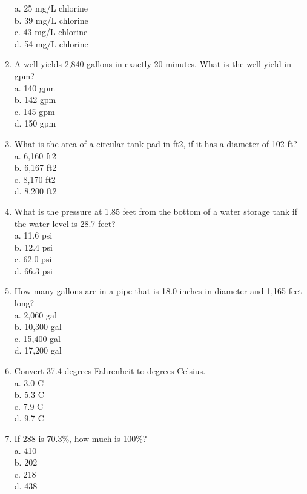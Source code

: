 \documentclass{article}
\begin{document}
\begin{enumerate}
a.	25 mg/L chlorine\\
b.	39 mg/L chlorine\\
c.	43 mg/L chlorine\\
d.	54 mg/L chlorine\\
\item A well yields 2,840 gallons in exactly 20 minutes. What is the well yield in gpm?\\
a.	140 gpm\\
b.	142 gpm\\
c.	145 gpm\\
d.	150 gpm\\
\item What is the area of a circular tank pad in ft2, if it has a diameter of 102 ft?\\
a.	6,160 ft2\\
b.	6,167 ft2\\
c.	8,170 ft2\\
d.	8,200 ft2\\
\item What is the pressure at 1.85 feet from the bottom of a water storage tank if the water level is 28.7 feet?\\
a.	11.6 psi\\
b.	12.4 psi\\
c.	62.0 psi\\
d.	66.3 psi\\
\item How many gallons are in a pipe that is 18.0 inches in diameter and 1,165 feet long?\\
a.	2,060 gal\\
b.	10,300 gal\\
c.	15,400 gal\\
d.	17,200 gal\\
\item Convert 37.4 degrees Fahrenheit to degrees Celsius.\\
a.	3.0 C\\
b.	5.3 C\\
c.	7.9 C\\
d.	9.7 C\\
\item If 288 is 70.3\%, how much is 100\%?\\
a.	410\\
b.	202\\
c.	218\\
d.	438\\



\end{enumerate}
\end{document}
